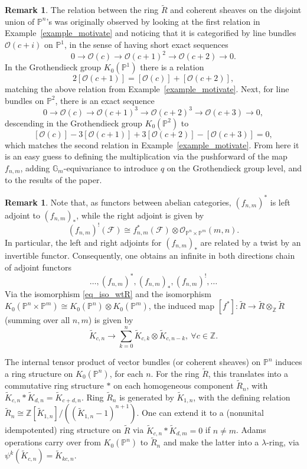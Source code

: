 \documentclass{article}
\def\lra{\longrightarrow}
\def\Z{\mathbb Z}
\newcommand{\mcO}{\mathcal{O}}
\newcommand{\mcF}{\mathcal{F}}
\newcommand{\wtR}{\widetilde{R}}
\newcommand{\wtK}{\widetilde{K}}
\newcommand{\PP}{\mathbb{P}}
\theoremstyle{definition}
\newtheorem{remark}[thm]{Remark}
\theoremstyle{definition}
\begin{document}
\begin{remark}
    The relation between the ring $\wtR$ and coherent sheaves on the disjoint union of $\PP^n$'s was originally observed by looking at the first relation in Example~\ref{example_motivate} and noticing that it is categorified by line bundles $\mcO(c+i)$ on $\PP^1$, in the sense of having short exact sequences
    \[
    0 \lra \mcO(c) \lra \mcO(c+1)^2\lra \mcO(c+2) \lra 0.
    \]
    In the Grothendieck group $K_0(\PP^1)$ there is a relation
    \[
2[\mcO(c+1)]=[\mcO(c)]+[\mcO(c+2)]
    , \]
    matching the above relation from Example~\ref{example_motivate}. Next, for line bundles on $\PP^2$, there is an exact sequence
    \[
    0\lra \mcO(c)\lra \mcO(c+1)^3 \lra \mcO(c+2)^3 \lra \mcO(c+3) \lra 0,
    \]
    descending in the Grothendieck group $K_0(\PP^2)$ to
    \[
    [\mcO(c)]-3[\mcO(c+1)]+3[\mcO(c+2)]- [\mcO(c+3)] = 0 ,
    \]
    which matches the second relation in Example~\ref{example_motivate}. From here it is an easy guess to defining the multiplication via the pushforward of the map $f_{n,m}$, adding $\mathbb{G}_m$-equivariance to introduce $q$ on the Grothendieck group level, and to the results of the paper.
\end{remark}

\begin{remark}
Note that, as functors between abelian categories, $(f_{n,m})^{\ast}$ is left adjoint to $(f_{n,m})_{\ast} $, while the right adjoint is given by
\begin{equation}
(f_{n,m})^{!}(\mcF) \cong f_{n,m}^{\ast}(\mcF)\otimes \mcO_{\PP^n\times\PP^m}(m,n).
\end{equation}
In particular, the left and right adjoints for $(f_{n,m})_{\ast}$ are related by a twist by an invertible functor. Consequently, one obtains an infinite in both directions chain of adjoint functors
\[
  \dots, (f_{n,m})^{\ast},(f_{n,m})_{\ast},(f_{n,m})^!,\dots \]
  Via the isomorphism \eqref{eq_iso_wtR} and the isomorphism $K_0(\PP^n\times \PP^m)\cong K_0(\PP^n)\otimes K_0(\PP^m)$, the induced map $[f^{\ast}]: \wtR \lra \wtR \otimes_{\Z} \wtR$ (summing over all $n,m$) is given by
  \[
  \wtK_{c,n}\lra \sum_{k=0}^n \wtK_{c,k}\otimes \wtK_{c,n-k},  \ \forall c\in \Z.
  \]
\end{remark}
The internal tensor product of vector bundles (or coherent sheaves) on $\PP^n$ induces a ring structure on $K_0(\PP^n)$, for each $n$. For the ring $\wtR$, this translates into a commutative ring structure $\ast$ on each homogeneous component $\wtR_n$, with $\wtK_{c,n}\ast \wtK_{d,n}=\wtK_{c+d,n}$. Ring $\wtR_n$ is generated by $\wtK_{1,n}$, with the defining relation $\wtR_n\cong \Z[\wtK_{1,n}]/((\wtK_{1,n}-1)^{n+1})$.
One can extend it to a (nonunital idempotented) ring structure on $\wtR$ via $\wtK_{c,n}\ast \wtK_{d,m}=0$ if $n\not= m$.
Adams operations carry over from $K_0(\PP^n)$ to $\wtR_n$ and make the latter into a $\lambda$-ring, via $\psi^k(\wtK_{c,n})=\wtK_{kc,n}$.
\end{document}
